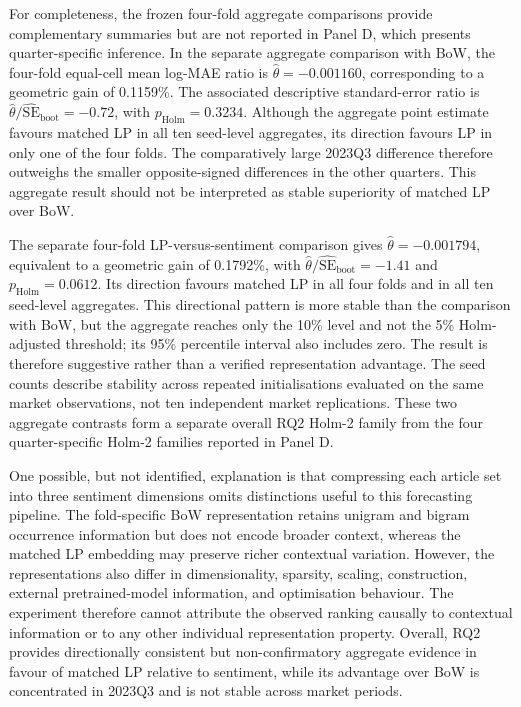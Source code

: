 For completeness, the frozen four-fold aggregate comparisons provide
complementary summaries but are not reported in Panel D, which presents
quarter-specific inference. In the separate aggregate comparison with BoW,
the four-fold equal-cell mean log-MAE ratio is
$\widehat{\theta}=-0.001160$, corresponding to a geometric gain of 0.1159\%.
The associated descriptive standard-error ratio is
$\widehat{\theta}/\widehat{\mathrm{SE}}_{\mathrm{boot}}=-0.72$, with
$p_{\mathrm{Holm}}=0.3234$. Although the aggregate point estimate favours
matched LP in all ten seed-level aggregates, its direction favours LP in only
one of the four folds. The comparatively large 2023Q3 difference therefore
outweighs the smaller opposite-signed differences in the other quarters. This
aggregate result should not be interpreted as stable superiority of matched
LP over BoW.

The separate four-fold LP-versus-sentiment comparison gives
$\widehat{\theta}=-0.001794$, equivalent to a geometric gain of 0.1792\%,
with
$\widehat{\theta}/\widehat{\mathrm{SE}}_{\mathrm{boot}}=-1.41$ and
$p_{\mathrm{Holm}}=0.0612$. Its direction favours matched LP in all four
folds and in all ten seed-level aggregates. This directional pattern is more
stable than the comparison with BoW, but the aggregate reaches only the 10\%
level and not the 5\% Holm-adjusted threshold; its 95\% percentile interval
also includes zero. The result is therefore suggestive rather than a verified
representation advantage. The seed counts describe stability across repeated
initialisations evaluated on the same market observations, not ten independent
market replications. These two aggregate contrasts form a separate overall
RQ2 Holm-2 family from the four quarter-specific Holm-2 families reported in
Panel D.

One possible, but not identified, explanation is that compressing each article
set into three sentiment dimensions omits distinctions useful to this
forecasting pipeline. The fold-specific BoW representation retains unigram
and bigram occurrence information but does not encode broader context, whereas
the matched LP embedding may preserve richer contextual variation. However,
the representations also differ in dimensionality, sparsity, scaling,
construction, external pretrained-model information, and optimisation
behaviour. The experiment therefore cannot attribute the observed ranking
causally to contextual information or to any other individual representation
property. Overall, RQ2 provides directionally consistent but non-confirmatory
aggregate evidence in favour of matched LP relative to sentiment, while its
advantage over BoW is concentrated in 2023Q3 and is not stable across market
periods.

